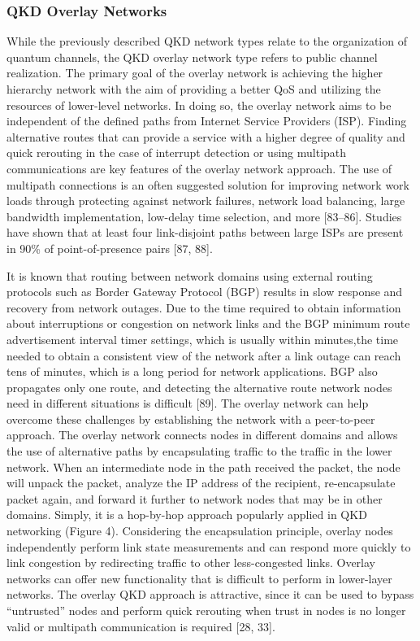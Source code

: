 \subsubsection*{QKD Overlay Networks}
While the previously described QKD network types relate to the organization of quantum channels, the QKD overlay network type refers to public channel realization. The primary goal of the overlay network is achieving the higher hierarchy network with the aim of providing a better QoS and utilizing the resources of lower-level networks. In doing so, the overlay network aims to be independent of the defined paths from Internet Service Providers (ISP). Finding alternative routes that can provide a service with a higher degree of quality and quick rerouting in the case of interrupt detection or using multipath communications are key features of the overlay network approach. The use of multipath connections is an often suggested solution for improving network work loads through protecting against network failures, network load balancing, large bandwidth implementation, low-delay time selection, and more [83–86]. Studies have shown that at least four link-disjoint paths between large ISPs are present in 90\% of point-of-presence pairs [87, 88].

It is known that routing between network domains using external routing protocols such as Border Gateway Protocol (BGP) results in slow response and recovery from network outages. Due to the time required to obtain information about interruptions or congestion on network links and the BGP minimum route advertisement interval timer settings, which is usually within minutes,the time needed to obtain a consistent view of the network after a link outage can reach tens of minutes, which is a long period for network applications. BGP also propagates only one route, and detecting the alternative route network nodes need in different situations is difficult [89].
The overlay network can help overcome these challenges by establishing the network with a peer-to-peer approach. The overlay network connects nodes in different domains and allows the use of alternative paths by encapsulating traffic to the traffic in the lower network. When an intermediate node in the path received the packet, the node will unpack the packet, analyze the IP address of the recipient, re-encapsulate packet again, and forward it further to network nodes that may be in other domains. Simply, it is a hop-by-hop approach popularly applied in QKD networking (Figure 4). Considering the encapsulation principle, overlay nodes independently perform link state measurements and can respond more quickly to link congestion by redirecting traffic to other less-congested links. Overlay networks can offer new functionality that is difficult to perform in lower-layer networks. The overlay QKD approach is attractive, since it can be used to bypass “untrusted” nodes and perform quick rerouting when trust in nodes is no longer valid or multipath communication is required [28, 33].

